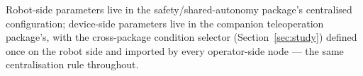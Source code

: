 \endgroup

Robot-side parameters live in the safety/shared-autonomy package's centralised configuration; device-side parameters live in the companion teleoperation package's, with the cross-package condition selector (Section~\ref{sec:study}) defined once on the robot side and imported by every operator-side node --- the same centralisation rule throughout.

